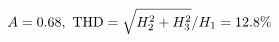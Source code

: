 \documentclass[preview]{standalone}
\begin{document}
\begin{align*}
\special{dvisvgm:raw <g id='unique000'>}A=0.68,\ \text{THD}=\sqrt{H_2^2+H_3^2}/H_1=12.8\%\special{dvisvgm:raw </g>}
\end{align*}
\end{document}
